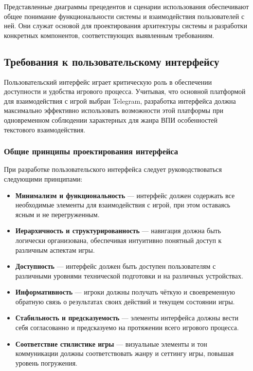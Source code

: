 Представленные диаграммы прецедентов и сценарии использования обеспечивают общее понимание функциональности системы и взаимодействия пользователей с ней. Они служат основой для проектирования архитектуры системы и разработки конкретных компонентов, соответствующих выявленным требованиям.

\subsection{Требования к пользовательскому интерфейсу}

Пользовательский интерфейс играет критическую роль в обеспечении доступности и удобства игрового процесса. Учитывая, что основной платформой для взаимодействия с игрой выбран Telegram, разработка интерфейса должна максимально эффективно использовать возможности этой платформы при одновременном соблюдении характерных для жанра ВПИ особенностей текстового взаимодействия.

\subsubsection{Общие принципы проектирования интерфейса}

При разработке пользовательского интерфейса следует руководствоваться следующими принципами:

\begin{itemize}
    \item \textbf{Минимализм и функциональность} — интерфейс должен содержать все необходимые элементы для взаимодействия с игрой, при этом оставаясь ясным и не перегруженным.

    \item \textbf{Иерархичность и структурированность} — навигация должна быть логически организована, обеспечивая интуитивно понятный доступ к различным аспектам игры.

    \item \textbf{Доступность} — интерфейс должен быть доступен пользователям с различными уровнями технической подготовки и на различных устройствах.

    \item \textbf{Информативность} — игроки должны получать чёткую и своевременную обратную связь о результатах своих действий и текущем состоянии игры.

    \item \textbf{Стабильность и предсказуемость} — элементы интерфейса должны вести себя согласованно и предсказуемо на протяжении всего игрового процесса.

    \item \textbf{Соответствие стилистике игры} — визуальные элементы и тон коммуникации должны соответствовать жанру и сеттингу игры, повышая уровень погружения.
\end{itemize}

